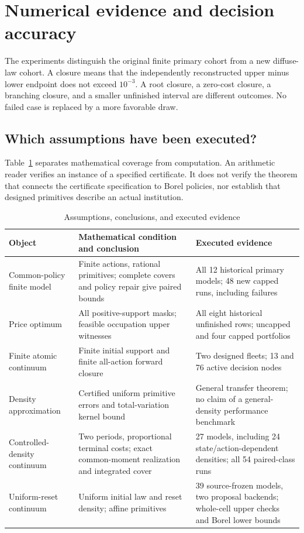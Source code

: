 \section{Numerical evidence and decision accuracy}\label{sec:evidence48}\label{sec:evidence50}
The experiments distinguish the original finite primary cohort from a new diffuse-law cohort. A closure means that the independently reconstructed upper minus lower endpoint does not exceed $10^{-3}$. A root closure, a zero-cost closure, a branching closure, and a smaller unfinished interval are different outcomes. No failed case is replaced by a more favorable draw.

\subsection{Which assumptions have been executed?}
Table~\ref{tab:assumptions50} separates mathematical coverage from computation. An arithmetic reader verifies an instance of a specified certificate. It does not verify the theorem that connects the certificate specification to Borel policies, nor establish that designed primitives describe an actual institution.
\begin{table}[htbp]\centering\small
\caption{Assumptions, conclusions, and executed evidence}\label{tab:assumptions50}
\begin{tabularx}{\textwidth}{@{}p{}XX@{}}\toprule
Object & Mathematical condition and conclusion & Executed evidence\\\midrule
Common-policy finite model & Finite actions, rational primitives; complete covers and policy repair give paired bounds & All 12 historical primary models; 48 new capped runs, including failures\\
Price optimum & All positive-support masks; feasible occupation upper witnesses & All eight historical unfinished rows; uncapped and four capped portfolios\\
Finite atomic continuum & Finite initial support and finite all-action forward closure & Two designed fleets; 13 and 76 active decision nodes\\
Density approximation & Certified uniform primitive errors and total-variation kernel bound & General transfer theorem; no claim of a general-density performance benchmark\\
Controlled-density continuum & Two periods, proportional terminal costs; exact common-moment realization and integrated cover & 27 models, including 24 state/action-dependent densities; all 54 paired-class runs \\
Uniform-reset continuum & Uniform initial law and reset density; affine primitives & 39 source-frozen models, two proposal backends; whole-cell upper checks and Borel lower bounds\\\bottomrule
\end{tabularx}
\end{table}

